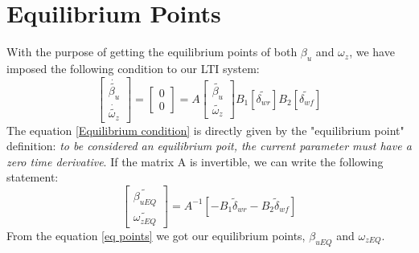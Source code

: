 	\section{Equilibrium Points}
	With the purpose of getting the equilibrium points of both $\beta_{u}$ and $\omega_{z}$, we have imposed the following condition to our LTI system:
	\begin{equation} \label{Equilibrium condition}
	\begin{bmatrix}
	\dot{\tilde{\beta_{u}}} \\
	\dot{\tilde{\omega_{z}}}
	\end{bmatrix} =
	\begin{bmatrix}
	0 \\
	0
	\end{bmatrix} = A
	\begin{bmatrix}
	\tilde{\beta_{u}} \\
	\tilde{\omega_{z}}
	\end{bmatrix} 
	B_{1}[\tilde{\delta_{wr}}] B_{2}[\tilde{\delta_{wf}}]
	\end{equation}
	The equation \ref{Equilibrium condition} is directly given by the "equilibrium point" definition: \textit{to be considered an equilibrium poit, the current parameter must have a zero time derivative}. If the matrix A is invertible, we can write the following statement:
	\begin{equation} \label{eq points}
	\begin{bmatrix}
	\tilde{\beta_{uEQ}} \\
	\tilde{\omega_{zEQ}}
	\end{bmatrix} = 
	A^{-1}[-B_{1} \tilde\delta_{wr} - B_{2} \tilde\delta_{wf}]
	\end{equation}
	From the equation \ref{eq points} we got our equilibrium points, $\beta_{uEQ}$ and $\omega_{zEQ}$.